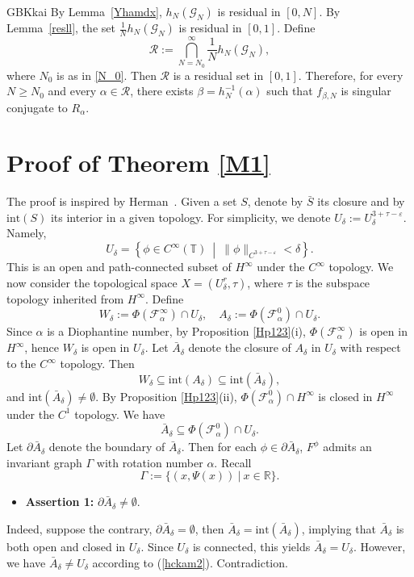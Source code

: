 \documentclass{amsart}
\newcommand{\R}{\mathbb{R}}
\newcommand{\al}{\alpha}
\newcommand{\eps}{\varepsilon}
\theoremstyle{definition}
\begin{document}
\begin{CJK*}{GBK}{kai}
By Lemma~\ref{Yhamdx}, $h_N(\mathcal{G}_N)$ is residual in $[0, N]$. By Lemma~\ref{resll}, the set $\frac{1}{N} h_N(\mathcal{G}_N)$ is residual in $[0, 1]$. Define
\[
\mathcal{R} := \bigcap_{N = N_0}^{\infty} \frac{1}{N} h_N(\mathcal{G}_N),
\]
where $N_0$ is as in \eqref{N_0}. Then $\mathcal{R}$ is a residual set in $[0, 1]$. Therefore, for every $N \geq N_0$ and every $\alpha \in \mathcal{R}$, there exists $\beta = h_N^{-1}(\alpha)$ such that $f_{\beta,N}$ is singular conjugate to $R_\alpha$.

		\vspace{1em}

		\section{\sc Proof of Theorem \ref{M1}}
		The proof is inspired by Herman~\cite[Chapter II]{H1}. Given a set \( S \), denote by \( \bar{S} \) its closure and by \( \mathrm{int}(S) \) its interior in a given topology. For simplicity, we denote $U_\delta:=U_\delta^{3+\tau-\eps}$. Namely,
		\[U_\delta=\left\{ \phi \in C^\infty(\mathbb{T})\ \middle|\ \|\phi\|_{C^{3+\tau-\eps}} < \delta \right\}.\]
		This is an open and path-connected subset of \( {H}^\infty \) under the \( C^\infty \) topology. We now consider the topological space \( X = (U^r_\delta, \tau) \), where \( \tau \) is the subspace topology inherited from \( {H}^\infty \).
		Define
		\[
		W_\delta := \Phi(\mathcal{F}_\al^\infty) \cap U_\delta, \quad A_\delta := \Phi(\mathcal{F}_\al^0) \cap U_\delta.
		\]
		Since $\al$ is a Diophantine number, by Proposition \ref{Hp123}(i), \( \Phi(\mathcal{F}_\al^\infty) \) is open in \( {H}^\infty \), hence \( W_\delta \) is open in \( U_\delta \). Let \( \bar{A}_\delta \) denote the closure of \( A_\delta \) in \( U_\delta \) with respect to the \( C^\infty \) topology. Then
		\[
		W_\delta \subseteq \mathrm{int}(A_\delta) \subseteq \mathrm{int}(\bar{A}_\delta),
		\]
		and \( \mathrm{int}(\bar{A}_\delta) \neq \emptyset \). By Proposition \ref{Hp123}(ii), $\Phi(\mathcal{F}_\al^0)\cap H^\infty$ is closed in $H^\infty$ under the $C^1$ topology. We have
		\[\bar{A}_\delta\subseteq \Phi(\mathcal{F}_\al^0) \cap U_\delta.\]
		Let \( \partial\bar{A}_\delta \) denote the boundary of \( \bar{A}_\delta \). Then for each $\phi\in \partial\bar{A}_\delta$, $F^\phi$ admits an invariant graph ${\Gamma}$ with rotation number $\al$. Recall
		\[{\Gamma}:=\{(x,{\Psi}(x))\ |\ x\in\R\}.\]
		
		\begin{itemize}
			\item \textbf{Assertion 1:} \( \partial\bar{A}_\delta \neq \emptyset \).
		\end{itemize}
		Indeed, suppose the contrary, \( \partial\bar{A}_\delta = \emptyset \), then \( \bar{A}_\delta = \mathrm{int}(\bar{A}_\delta) \), implying that \( \bar{A}_\delta \) is both open and closed in \( U_\delta \). Since \( U_\delta \) is connected, this yields \( \bar{A}_\delta = U_\delta \). However, we have \( \bar{A}_\delta \neq U_\delta \) according to (\ref{hckam2}). Contradiction.
		

\end{CJK*}
\end{document}
